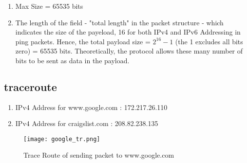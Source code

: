 \documentclass[12pt]{article}
\begin{document}
\begin{enumerate}
    \begin{enumerate}
        \item Max Size = 65535 bits
        \item The length of the field - "total length" in the packet structure - which indicates the size of the payeload, 16 for both IPv4 and IPv6 Addressing in ping packets. Hence, the total payload size = $2^{16} - 1$ (the 1 excludes all bits zero) = 65535 bits. Theoretically, the protocol allows these many number of bits to be sent as data in the payload.
    \end{enumerate}
\end{enumerate}

\subsection{traceroute}
\begin{enumerate}
    \item IPv4 Address for www.google.com : 172.217.26.110
    \item IPv4 Address for craigslist.com : 208.82.238.135
\end{enumerate}

\begin{figure}[h!]
    \centering
    \texttt{[image: google\_tr.png]}
    \caption{Trace Route of sending packet to www.google.com}
\end{figure}
\end{document}
